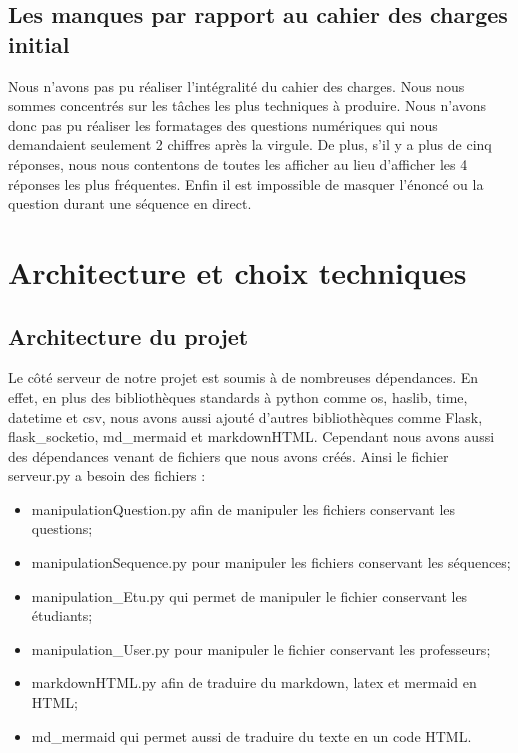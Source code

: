 \documentclass[a4paper, 12pt]{article}
\begin{document}
\subsection{Les manques par rapport au cahier des charges initial}
Nous n'avons pas pu réaliser l'intégralité du cahier des charges. Nous nous sommes concentrés sur les tâches les plus techniques à produire. Nous n'avons donc pas pu réaliser les formatages des questions numériques qui nous demandaient seulement 2 chiffres après la virgule. De plus, s'il y a plus de cinq réponses, nous nous contentons de toutes les afficher au lieu d'afficher les 4 réponses les plus fréquentes. Enfin il est impossible de masquer l'énoncé ou la question durant une séquence en direct.

\newpage
\section{Architecture et choix techniques}

\subsection{Architecture du projet}

Le côté serveur de notre projet est soumis à de nombreuses dépendances.
En effet, en plus des bibliothèques standards à python comme os, haslib, time, datetime et csv, nous avons aussi ajouté d'autres bibliothèques comme Flask, flask\_socketio, md\_mermaid et markdownHTML. 
Cependant nous avons aussi des dépendances venant de fichiers que nous avons créés.
\newline
Ainsi le fichier serveur.py a besoin des fichiers :
\begin{itemize}
    \item manipulationQuestion.py afin de manipuler les fichiers conservant les questions;
    \item manipulationSequence.py pour manipuler les fichiers conservant les séquences;
    \item manipulation\_Etu.py qui permet de manipuler le fichier conservant les étudiants;
    \item manipulation\_User.py pour manipuler le fichier conservant les professeurs;
    \item markdownHTML.py afin de traduire du markdown, latex et mermaid en HTML;
    \item md\_mermaid qui permet aussi de traduire du texte en un code HTML.
\end{itemize}
\end{document}
